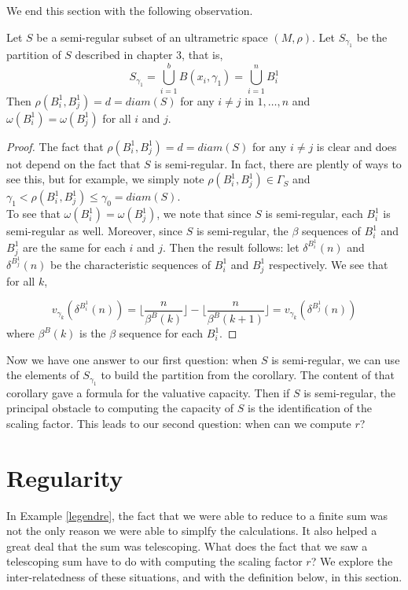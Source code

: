 We end this section with the following observation.

\begin{proposition}
	Let $S$ be a semi-regular subset of an ultrametric space $(M,\rho)$. Let $S_{\gamma_1}$ be the partition of $S$ described in chapter $3$, that is,
	\[S_{\gamma_1} = \bigcup_{i=1}^{b} B(x_i,\gamma_1) = \bigcup_{i=1}^{n} B^1_i\]
	Then $\rho(B^1_i, B^1_j) = d = diam(S)$ for any $i \neq j$ in $1,\ldots,n$ and $\omega( B^1_i) = \omega( B^1_j)$ for all $i$ and $j$.
\end{proposition}

\begin{proof}
	The fact that  $\rho(B^1_i, B^1_j) = d = diam(S)$ for any $i \neq j$ is clear and does not depend on the fact that $S$ is semi-regular. In fact, there are plently of ways to see this, but for example, we simply note $\rho(B^1_i, B^1_j) \in \Gamma_S$  and $ \gamma_1 < \rho(B^1_i, B^1_j)\leq \gamma_0 = diam(S)$.\\
	
	To see that $\omega( B^1_i) = \omega( B^1_j)$, we note that since $S$ is semi-regular, each $B^1_i$ is semi-regular as well. Moreover, since $S$ is semi-regular, the $\beta$ sequences of $B^1_i$ and $B^1_j$ are the same for each $i$ and $j$. Then the result follows: let $\delta^{B^1_i}(n)$ and $\delta^{B^1_j}(n)$ be the characteristic sequences of $B^1_i$ and $B^1_j$ respectively. We see that for all $k$,
	  
	  \[v_{\gamma_k}(\delta^{B^1_i}(n)) =  \lfloor\frac{n}{\beta^B(k)}\rfloor - \lfloor\frac{n}{\beta^B(k+1)}\rfloor =  v_{\gamma_k}(\delta^{B^1_j}(n)) \]
	where $\beta^B(k)$ is the $\beta$ sequence for each  $B^1_i$.
	 
\end{proof}

Now we have one answer to our first question: when $S$ is semi-regular, we can use the elements of $S_{\gamma_1}$ to build the partition from the corollary. The content of that corollary gave a formula for the valuative capacity. Then if $S$ is semi-regular, the principal obstacle to computing the capacity of $S$ is the identification of the scaling factor. This leads to our second question: when can we compute $r$?

\section{Regularity}
In Example \ref{legendre}, the fact that we were able to reduce to a finite sum was not the only reason we were able to simplfy the calculations. It also helped a great deal that the sum was telescoping. What does the fact that we saw a telescoping sum have to do with computing the scaling factor $r$? We explore the inter-relatedness of these situations, and with the definition below, in this section.

